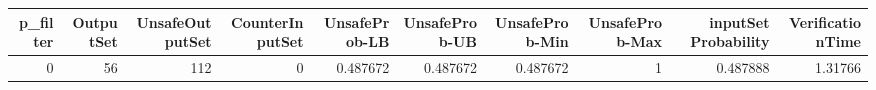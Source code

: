 \begin{tabular}{rrrrrrrrrr}
\hline
   p\_filter &   OutputSet &   UnsafeOutputSet &   CounterInputSet &   UnsafeProb-LB &   UnsafeProb-UB &   UnsafeProb-Min &   UnsafeProb-Max &   inputSet Probability &   VerificationTime \\
\hline
          0 &          56 &               112 &                 0 &        0.487672 &        0.487672 &         0.487672 &                1 &               0.487888 &            1.31766 \\
\hline
\end{tabular}
